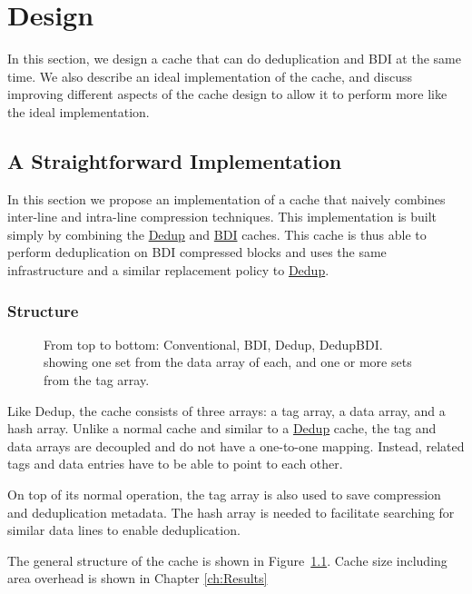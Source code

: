 
\chapter{Design}
\label{ch:Design}
In this section, we design a cache that can do deduplication and BDI at the same time. We also describe an ideal implementation of the cache, and discuss improving different aspects of the cache design to allow it to perform more like the ideal implementation.
\section{A Straightforward Implementation}
\label{sec:Straightforward Implementation}
In this section we propose an implementation of a cache that naively combines inter-line and intra-line compression techniques. This implementation is built simply by combining the \hyperref[sec:Dedup]{Dedup} and \hyperref[sec:BDI]{BDI} caches. This cache is thus able to perform deduplication on BDI compressed blocks and uses the same infrastructure and a similar replacement policy to \hyperref[sec:Dedup]{Dedup}.

\subsection{Structure}
\label{ssec:DedupBDIStructure}
\begin{figure}
    \caption[DedupBDI Cache]{From top to bottom: Conventional, BDI, Dedup, DedupBDI. showing one set from the data array of each, and one or more sets from the tag array.}
    \label{fig:DedupBDI}
\end{figure}
Like Dedup, the cache consists of three arrays: a tag array, a data array, and a hash array. Unlike a normal cache and similar to a \hyperref[sec:Dedup]{Dedup} cache, the tag and data arrays are decoupled and do not have a one-to-one mapping. Instead, related tags and data entries have to be able to point to each other.\par
On top of its normal operation, the tag array is also used to save compression and deduplication metadata. The hash array is needed to facilitate searching for similar data lines to enable deduplication.\par
The general structure of the cache is shown in Figure~\ref{fig:DedupBDI}. Cache size including area overhead is shown in Chapter \ref{ch:Results}
